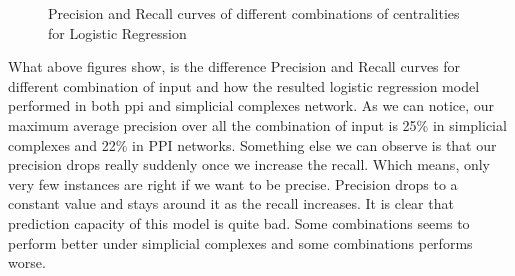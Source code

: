 \documentclass[9pt]{article}
\begin{document}
\begin{figure}[!htb]
\endminipage
\caption{Precision and Recall curves of different combinations of centralities for Logistic Regression}
\end{figure}
What above figures show, is the difference Precision and Recall curves for different combination of input and how the resulted logistic regression model performed in both ppi and simplicial complexes network. As we can notice, our maximum average precision over all the combination of input is 25\% in simplicial complexes and 22\% in PPI networks. Something else we can observe is that our precision drops really suddenly once we increase the recall. Which means, only very few instances are right if we want to be precise. Precision drops to a constant value and stays around it as the recall increases. It is clear that prediction capacity of this model is quite bad. Some combinations seems to perform better under simplicial complexes and some combinations performs worse.
\end{document}
